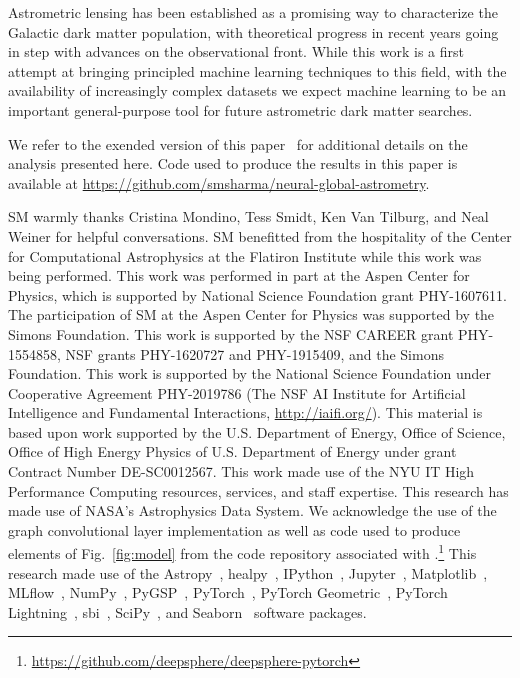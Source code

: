 \documentclass[]{article}
\begin{document}
Astrometric lensing has been established as a promising way to characterize the Galactic dark matter population, with theoretical progress in recent years going in step with advances on the observational front. While this work is a first attempt at bringing principled machine learning techniques to this field, with the availability of increasingly complex datasets we expect machine learning to be an important general-purpose tool for future astrometric dark matter searches.

We refer to the exended version of this paper~\cite{Mishra-Sharma:2021nhh} for additional details on the analysis presented here. 
Code used to produce the results in this paper is available at \url{https://github.com/smsharma/neural-global-astrometry}. 

\begin{ack}
SM warmly thanks Cristina Mondino, Tess Smidt, Ken Van Tilburg, and Neal Weiner for helpful conversations. SM benefitted from the hospitality of the Center for Computational Astrophysics at the Flatiron Institute while this work was being performed. 
This work was performed in part at the Aspen Center for Physics, which is supported by National Science Foundation grant PHY-1607611.
The participation of SM at the Aspen Center for Physics was supported by the Simons Foundation.
This work is supported by the NSF CAREER grant PHY-1554858, NSF grants PHY-1620727 and PHY-1915409, and the Simons Foundation. 
This work is supported by the National Science Foundation under Cooperative Agreement PHY-2019786 (The NSF AI Institute for Artificial Intelligence and Fundamental Interactions, \url{http://iaifi.org/}).
This material is based upon work supported by the U.S. Department of Energy, Office of Science, Office of High Energy Physics of U.S. Department of Energy under grant Contract Number DE-SC0012567.
This work made use of the NYU IT High Performance Computing resources, services, and staff expertise. 
This research has made use of NASA's Astrophysics Data System. We acknowledge the use of the \deepsphere graph convolutional layer implementation as well as code used to produce elements of Fig.~\ref{fig:model} from the code repository associated with \citet{2020arXiv201215000D}.\footnote{\url{https://github.com/deepsphere/deepsphere-pytorch}}
This research made use of the Astropy~\cite{Robitaille:2013mpa,Price-Whelan:2018hus},
healpy~\cite{Gorski:2004by,Zonca2019},
IPython~\cite{PER-GRA:2007},
Jupyter~\cite{Kluyver2016JupyterN},
Matplotlib~\cite{Hunter:2007},
MLflow~\cite{chen2020developments},
NumPy~\cite{harris_array_2020},
PyGSP~\cite{michael_defferrard_2017_1003158},
PyTorch~\cite{NEURIPS2019_9015},
PyTorch Geometric~\cite{Fey/Lenssen/2019},
PyTorch Lightning~\cite{william_falcon_2020_3828935},
sbi~\cite{tejero-cantero2020sbi},
SciPy~\cite{2020SciPy-NMeth}, and
Seaborn~\cite{michael_waskom_2017_883859}
software packages.
\end{ack}
\end{document}
